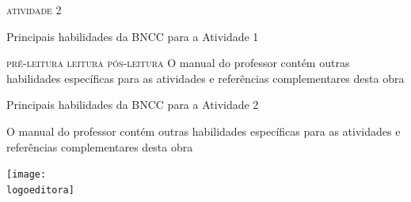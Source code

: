 \documentclass[smaller,professionalfonts,15pt]{beamer}
\begin{document}
\begin{frame}
\hfill\Huge
\textsc{atividade 2}
\end{frame}

\begin{frame}[plain]{Principais habilidades da BNCC para a Atividade 1}
\vspace{-2cm}

\textsc{pré-leitura}
\quad
\textsc{leitura}
\quad
\textsc{pós-leitura}
\vfill
	{\small O manual do professor contém outras habilidades específicas para as atividades e referências complementares desta obra}
\end{frame}

\begin{frame}[plain]{Principais habilidades da BNCC para a Atividade 2}
\vspace{-2cm}


\vfill
	{\small O manual do professor contém outras habilidades específicas para as atividades e referências complementares desta obra}

\end{frame}


\begin{frame}
\centering\hfill\texttt{[image: \\logoeditora]}
\end{frame}
\end{document}
